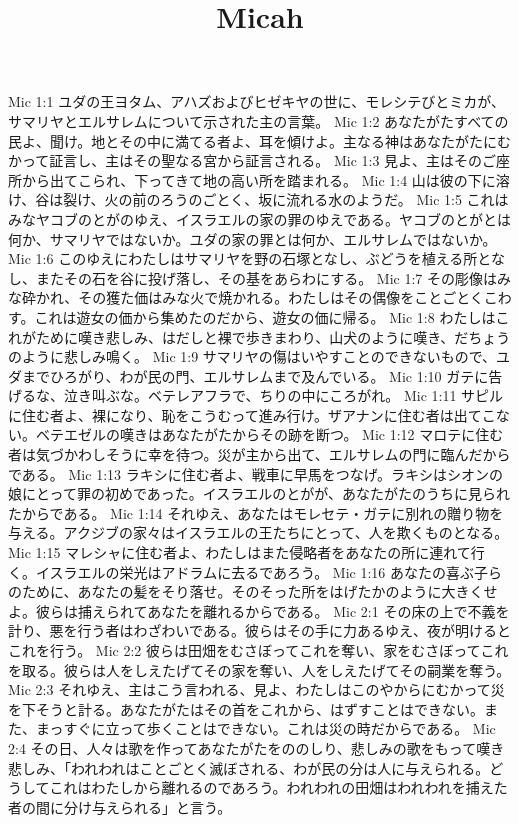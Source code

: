

\title{Micah}

Mic 1:1  ユダの王ヨタム、アハズおよびヒゼキヤの世に、モレシテびとミカが、サマリヤとエルサレムについて示された主の言葉。
Mic 1:2  あなたがたすべての民よ、聞け。地とその中に満てる者よ、耳を傾けよ。主なる神はあなたがたにむかって証言し、主はその聖なる宮から証言される。
Mic 1:3  見よ、主はそのご座所から出てこられ、下ってきて地の高い所を踏まれる。
Mic 1:4  山は彼の下に溶け、谷は裂け、火の前のろうのごとく、坂に流れる水のようだ。
Mic 1:5  これはみなヤコブのとがのゆえ、イスラエルの家の罪のゆえである。ヤコブのとがとは何か、サマリヤではないか。ユダの家の罪とは何か、エルサレムではないか。
Mic 1:6  このゆえにわたしはサマリヤを野の石塚となし、ぶどうを植える所となし、またその石を谷に投げ落し、その基をあらわにする。
Mic 1:7  その彫像はみな砕かれ、その獲た価はみな火で焼かれる。わたしはその偶像をことごとくこわす。これは遊女の価から集めたのだから、遊女の価に帰る。
Mic 1:8  わたしはこれがために嘆き悲しみ、はだしと裸で歩きまわり、山犬のように嘆き、だちょうのように悲しみ鳴く。
Mic 1:9  サマリヤの傷はいやすことのできないもので、ユダまでひろがり、わが民の門、エルサレムまで及んでいる。
Mic 1:10  ガテに告げるな、泣き叫ぶな。ベテレアフラで、ちりの中にころがれ。
Mic 1:11  サピルに住む者よ、裸になり、恥をこうむって進み行け。ザアナンに住む者は出てこない。ベテエゼルの嘆きはあなたがたからその跡を断つ。
Mic 1:12  マロテに住む者は気づかわしそうに幸を待つ。災が主から出て、エルサレムの門に臨んだからである。
Mic 1:13  ラキシに住む者よ、戦車に早馬をつなげ。ラキシはシオンの娘にとって罪の初めであった。イスラエルのとがが、あなたがたのうちに見られたからである。
Mic 1:14  それゆえ、あなたはモレセテ・ガテに別れの贈り物を与える。アクジブの家々はイスラエルの王たちにとって、人を欺くものとなる。
Mic 1:15  マレシャに住む者よ、わたしはまた侵略者をあなたの所に連れて行く。イスラエルの栄光はアドラムに去るであろう。
Mic 1:16  あなたの喜ぶ子らのために、あなたの髪をそり落せ。そのそった所をはげたかのように大きくせよ。彼らは捕えられてあなたを離れるからである。
Mic 2:1  その床の上で不義を計り、悪を行う者はわざわいである。彼らはその手に力あるゆえ、夜が明けるとこれを行う。
Mic 2:2  彼らは田畑をむさぼってこれを奪い、家をむさぼってこれを取る。彼らは人をしえたげてその家を奪い、人をしえたげてその嗣業を奪う。
Mic 2:3  それゆえ、主はこう言われる、見よ、わたしはこのやからにむかって災を下そうと計る。あなたがたはその首をこれから、はずすことはできない。また、まっすぐに立って歩くことはできない。これは災の時だからである。
Mic 2:4  その日、人々は歌を作ってあなたがたをののしり、悲しみの歌をもって嘆き悲しみ、「われわれはことごとく滅ぼされる、わが民の分は人に与えられる。どうしてこれはわたしから離れるのであろう。われわれの田畑はわれわれを捕えた者の間に分け与えられる」と言う。
